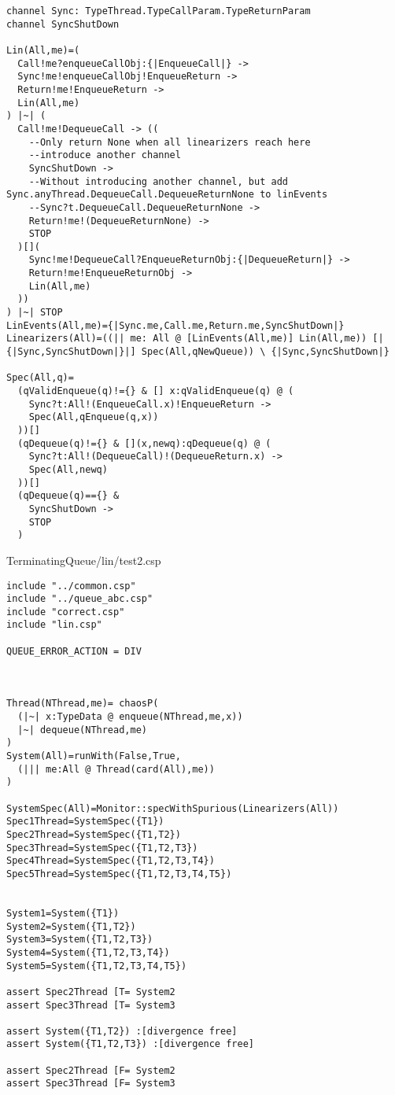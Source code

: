 \begin{lstlisting}
channel Sync: TypeThread.TypeCallParam.TypeReturnParam
channel SyncShutDown

Lin(All,me)=(
  Call!me?enqueueCallObj:{|EnqueueCall|} ->
  Sync!me!enqueueCallObj!EnqueueReturn ->
  Return!me!EnqueueReturn ->
  Lin(All,me)
) |~| (
  Call!me!DequeueCall -> ((
    --Only return None when all linearizers reach here
    --introduce another channel
    SyncShutDown ->
    --Without introducing another channel, but add Sync.anyThread.DequeueCall.DequeueReturnNone to linEvents
    --Sync?t.DequeueCall.DequeueReturnNone ->
    Return!me!(DequeueReturnNone) ->
    STOP
  )[](
    Sync!me!DequeueCall?EnqueueReturnObj:{|DequeueReturn|} ->
    Return!me!EnqueueReturnObj ->
    Lin(All,me)  
  ))
) |~| STOP
LinEvents(All,me)={|Sync.me,Call.me,Return.me,SyncShutDown|}
Linearizers(All)=((|| me: All @ [LinEvents(All,me)] Lin(All,me)) [|{|Sync,SyncShutDown|}|] Spec(All,qNewQueue)) \ {|Sync,SyncShutDown|}

Spec(All,q)=
  (qValidEnqueue(q)!={} & [] x:qValidEnqueue(q) @ (
    Sync?t:All!(EnqueueCall.x)!EnqueueReturn -> 
    Spec(All,qEnqueue(q,x))
  ))[]
  (qDequeue(q)!={} & [](x,newq):qDequeue(q) @ (
    Sync?t:All!(DequeueCall)!(DequeueReturn.x) ->
    Spec(All,newq)
  ))[]
  (qDequeue(q)=={} & 
    SyncShutDown ->
    STOP
  )

\end{lstlisting}
TerminatingQueue/lin/test2.csp
\begin{lstlisting}
include "../common.csp"
include "../queue_abc.csp"
include "correct.csp"
include "lin.csp"

QUEUE_ERROR_ACTION = DIV



Thread(NThread,me)= chaosP(
  (|~| x:TypeData @ enqueue(NThread,me,x))
  |~| dequeue(NThread,me)
)
System(All)=runWith(False,True,
  (||| me:All @ Thread(card(All),me)) 
)

SystemSpec(All)=Monitor::specWithSpurious(Linearizers(All))
Spec1Thread=SystemSpec({T1})
Spec2Thread=SystemSpec({T1,T2})
Spec3Thread=SystemSpec({T1,T2,T3})
Spec4Thread=SystemSpec({T1,T2,T3,T4})
Spec5Thread=SystemSpec({T1,T2,T3,T4,T5})


System1=System({T1})
System2=System({T1,T2})
System3=System({T1,T2,T3})
System4=System({T1,T2,T3,T4})
System5=System({T1,T2,T3,T4,T5})

assert Spec2Thread [T= System2
assert Spec3Thread [T= System3

assert System({T1,T2}) :[divergence free]
assert System({T1,T2,T3}) :[divergence free]

assert Spec2Thread [F= System2
assert Spec3Thread [F= System3

\end{lstlisting}
